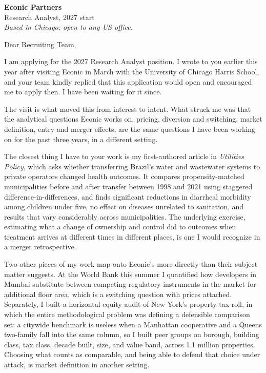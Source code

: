 


\textbf{Econic Partners} \\
Research Analyst, 2027 start \\
\textit{Based in Chicago; open to any US office.}

\vspace{8pt}

Dear Recruiting Team,

I am applying for the 2027 Research Analyst position. I wrote to you earlier this year after visiting Econic in March with the University of Chicago Harris School, and your team kindly replied that this application would open and encouraged me to apply then. I have been waiting for it since.

The visit is what moved this from interest to intent. What struck me was that the analytical questions Econic works on, pricing, diversion and switching, market definition, entry and merger effects, are the same questions I have been working on for the past three years, in a different setting.

The closest thing I have to your work is my first-authored article in \textit{Utilities Policy}, which asks whether transferring Brazil's water and wastewater systems to private operators changed health outcomes. It compares propensity-matched municipalities before and after transfer between 1998 and 2021 using staggered difference-in-differences, and finds significant reductions in diarrheal morbidity among children under five, no effect on diseases unrelated to sanitation, and results that vary considerably across municipalities. The underlying exercise, estimating what a change of ownership and control did to outcomes when treatment arrives at different times in different places, is one I would recognize in a merger retrospective.

Two other pieces of my work map onto Econic's more directly than their subject matter suggests. At the World Bank this summer I quantified how developers in Mumbai substitute between competing regulatory instruments in the market for additional floor area, which is a switching question with prices attached. Separately, I built a horizontal-equity audit of New York's property tax roll, in which the entire methodological problem was defining a defensible comparison set: a citywide benchmark is useless when a Manhattan cooperative and a Queens two-family fall into the same column, so I built peer groups on borough, building class, tax class, decade built, size, and value band, across 1.1 million properties. Choosing what counts as comparable, and being able to defend that choice under attack, is market definition in another setting.

